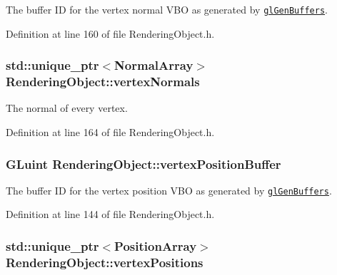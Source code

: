 The buffer I\+D for the vertex normal V\+B\+O as generated by \href{https://www.opengl.org/sdk/docs/man/html/glGenBuffers.xhtml}{\tt gl\+Gen\+Buffers}. 



Definition at line 160 of file Rendering\+Object.\+h.

\hypertarget{class_rendering_object_ac28d301f97d29ab603f65f8e823063b4}{}
\subsubsection[{vertex\+Normals}]{\setlength{\rightskip}{0pt plus 5cm}std\+::unique\+\_\+ptr$<${\bf Normal\+Array}$>$ Rendering\+Object\+::vertex\+Normals\hspace{0.3cm}{\ttfamily [protected]}}\label{class_rendering_object_ac28d301f97d29ab603f65f8e823063b4}


The normal of every vertex. 



Definition at line 164 of file Rendering\+Object.\+h.

\hypertarget{class_rendering_object_a473f623b39157288bef992e76ddc45a9}{}
\subsubsection[{vertex\+Position\+Buffer}]{\setlength{\rightskip}{0pt plus 5cm}G\+Luint Rendering\+Object\+::vertex\+Position\+Buffer\hspace{0.3cm}{\ttfamily [protected]}}\label{class_rendering_object_a473f623b39157288bef992e76ddc45a9}


The buffer I\+D for the vertex position V\+B\+O as generated by \href{https://www.opengl.org/sdk/docs/man/html/glGenBuffers.xhtml}{\tt gl\+Gen\+Buffers}. 



Definition at line 144 of file Rendering\+Object.\+h.

\hypertarget{class_rendering_object_a14721712672d0421ed72a394e3131da0}{}
\subsubsection[{vertex\+Positions}]{\setlength{\rightskip}{0pt plus 5cm}std\+::unique\+\_\+ptr$<${\bf Position\+Array}$>$ Rendering\+Object\+::vertex\+Positions\hspace{0.3cm}{\ttfamily [protected]}}\label{class_rendering_object_a14721712672d0421ed72a394e3131da0}



